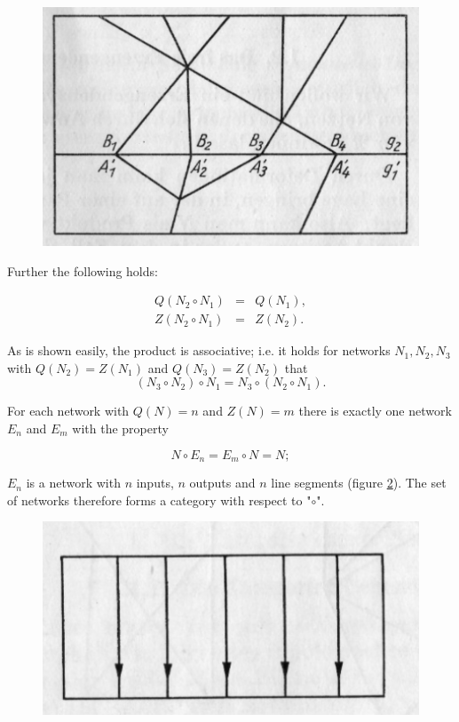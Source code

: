 \documentclass{article}
\begin{document}
\begin{figure}
\includegraphics[]{figure5.png}
\caption{}
\label{fig:figure5}
\end{figure}

Further the following holds:

\[
\begin{array}{lcr}
Q(N_2 \circ N_1) & = & Q(N_1), \\
Z(N_2 \circ N_1) & = & Z(N_2).
\end{array}
\]

As is shown easily, the product is associative; i.e. it holds for networks $N_1, N_2, N_3$ with $Q(N_2) = Z(N_1)$ and $Q(N_3) = Z(N_2)$ that
\[ (N_3 \circ N_2) \circ N_1 = N_3 \circ (N_2 \circ N_1). \]

For each network with $Q(N) = n$ and $Z(N) = m$ there is exactly one network $E_n$ and $E_m$ with the property

\[
N\circ E_n = E_m \circ N = N;
\]

$E_n$ is a network with $n$ inputs, $n$ outputs and $n$ line segments (figure \ref{fig:figure6}). The set of networks therefore forms a category with respect to "$\circ$".

\begin{figure}
\includegraphics[]{figure6.png}
\caption{}
\label{fig:figure6}
\end{figure}
\end{document}

